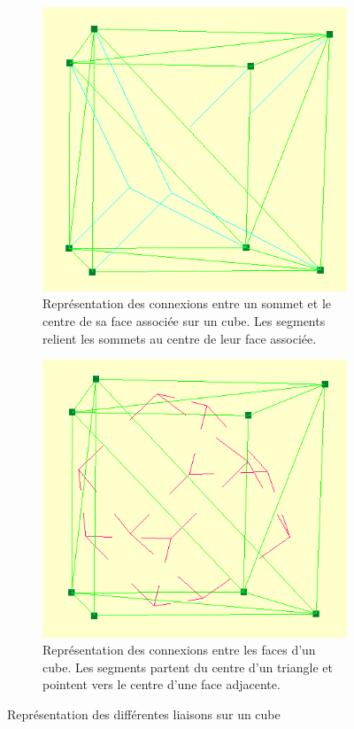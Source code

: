 \documentclass[12pt,a4paper,twoside]{report}
\begin{document}
\begin{figure}[H]
	\centering
	\begin{subfigure}{.4\textwidth}
		\centering
		\includegraphics[width=\textwidth]{connexions_sommets_cube.png}
		\caption{Représentation des connexions entre un sommet et le centre de sa face associée sur un cube. Les segments relient les sommets au centre de leur face associée.}
	\end{subfigure}
	\begin{subfigure}{.4\textwidth}
		\centering
		\includegraphics[width=\textwidth]{connexions_triangles_cube.png}
		\caption{Représentation des connexions entre les faces d'un cube. Les segments partent du centre d'un triangle et pointent vers le centre d'une face adjacente.}
	\end{subfigure}
	\caption{Représentation des différentes liaisons sur un cube}
	\label{fig:liaisons}
\end{figure}
\end{document}
